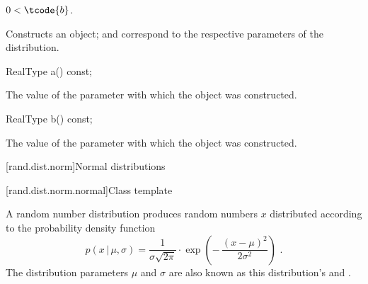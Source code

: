 \begin{itemdescr}
\pnum
\requires $0 < \tcode{b}$.

\pnum
\effects Constructs an  object;
 and 
correspond to the respective parameters of the distribution.
\end{itemdescr}

%
\begin{itemdecl}
RealType a() const;
\end{itemdecl}

\begin{itemdescr}
\pnum\returns The value of the  parameter
 with which the object was constructed.
\end{itemdescr}

%
\begin{itemdecl}
RealType b() const;
\end{itemdecl}

\begin{itemdescr}
\pnum\returns The value of the  parameter
 with which the object was constructed.
\end{itemdescr}%
%



[rand.dist.norm]{Normal distributions}%
%


[rand.dist.norm.normal]{Class template }%
%
%

\pnum
A  random number distribution
produces random numbers $x$
distributed according to
the probability density function%
%
%
\[%
 p(x\,|\,\mu,\sigma)
      = \frac{1}{\sigma \sqrt{2\pi}}
        \cdot
        \exp{\left(- \, \frac{(x - \mu)^2}
                             {2 \sigma^2}
             \right)
            }
 \text{ .}
\]
The distribution parameters $\mu$ and $\sigma$
are also known as this distribution's %
%
and %
%
%
.


